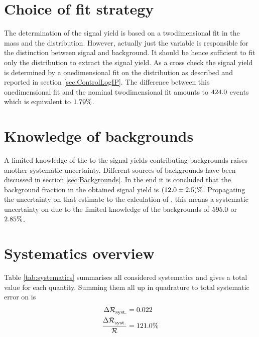 

\section{Choice of fit strategy}
The determination of the \LbToDpmunuX signal yield is based on a twodimensional fit in the \Dz\proton mass and the \logIP distribution.
However, actually just the \logIP variable is responsible for the distinction between signal and background.
It should be hence sufficient to fit only the \logIP distribution to extract the signal yield.
As a cross check the signal yield \NDp is determined by a onedimensional fit on the \logIP distribution as described and reported in section \ref{sec:ControlLogIP}. 
The difference between this onedimensional fit and the nominal twodimensional fit amounts to $424.0$ events which is equivalent to $1.79\%$.

\section{Knowledge of backgrounds}
A limited knowledge of the to the signal yields contributing backgrounds raises another systematic uncertainty.
Different sources of backgrounds have been discussed in section \ref{sec:Backgrounds}.
In the end it is concluded that the background fraction in the obtained signal yield \NDp is $(12.0 \pm 2.5)\%$.
Propagating the uncertainty on that estimate to the calculation of \R, this means a systematic uncertainty on \NDp due to the limited knowledge of the backgrounds of $595.0$ or $2.85\%$.

\section{Systematics overview}
Table \ref{tab:systematics} summarises all considered systematics and gives a total value for each quantity.
Summing them all up in quadrature to total systematic error on \R is
\begin{align*}
    \Delta{\ensuremath{\mathcal{R}}}^{\text{{}}}_{\text{syst.}} &= 0.022 \\
    \frac{\Delta{\ensuremath{\mathcal{R}}}^{\text{{}}}_{\text{syst.}}}{\mathcal{R}} &= 121.0\% 
\end{align*}


